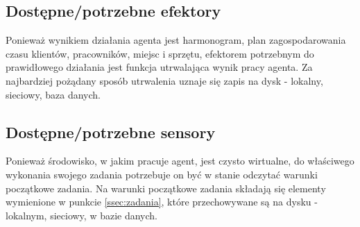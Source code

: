 
\subsection{Dostępne/potrzebne efektory}
Ponieważ wynikiem działania agenta jest harmonogram, plan zagospodarowania czasu klientów,
pracowników, miejsc i sprzętu, efektorem potrzebnym do prawidłowego działania jest funkcja
utrwalająca wynik pracy agenta. Za najbardziej pożądany sposób utrwalenia uznaje się zapis
na dysk - lokalny, sieciowy, baza danych.

\subsection{Dostępne/potrzebne sensory}
Ponieważ środowisko, w jakim pracuje agent, jest czysto wirtualne, do właściwego wykonania
swojego zadania potrzebuje on być w stanie odczytać warunki początkowe zadania. Na warunki
początkowe zadania składają się elementy wymienione w punkcie \ref{ssec:zadania}, które 
przechowywane są na dysku - lokalnym, sieciowy, w bazie danych.

